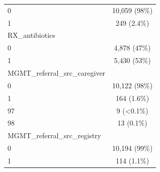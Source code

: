 \documentclass[
  letterpaper,
  DIV=11,
  numbers=noendperiod,
  oneside]{scrreprt}
\begin{document}
\begin{longtable}[]{@{}lc@{}}
0 & 10,059 (98\%) \\
1 & 249 (2.4\%) \\
RX\_antibiotics & \\
0 & 4,878 (47\%) \\
1 & 5,430 (53\%) \\
MGMT\_referral\_src\_caregiver & \\
0 & 10,122 (98\%) \\
1 & 164 (1.6\%) \\
97 & 9 (\textless0.1\%) \\
98 & 13 (0.1\%) \\
MGMT\_referral\_src\_registry & \\
0 & 10,194 (99\%) \\
1 & 114 (1.1\%) \\
\bottomrule()
\end{longtable}
\end{document}
